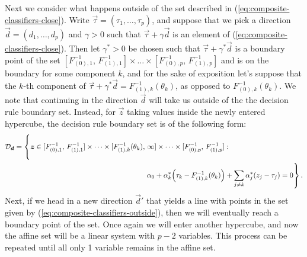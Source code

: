 Next we consider what happens outside of the set described in
(\ref{eq:composite-classifiers-close}).  Write
$\vec{\tau} = (\tau_1, \dots, \tau_p)$, and suppose that we pick a direction
$\vec{d} = (d_1, \dots, d_p)$ and $\gamma > 0$ such that
$\vec{\tau} + \gamma \vec{d}$ is an element of
(\ref{eq:composite-classifiers-close}).  Then let $\gamma^{*} > 0$ be chosen
such that $\vec{\tau} + \gamma^{*} \vec{d}$ is a boundary point of the set
$[F_{(0),1}^{-1},\, F_{(1),1}^{-1}] \times \dots \times [F_{(0),p}^{-1},\,
F_{(1),p}^{-1}]$ and is on the boundary for some component $k$, and for the sake
of exposition let's suppose that the $k$-th component of
$\vec{\tau} + \gamma^{*} \vec{d} = F_{(1),k}^{-1}(\theta_k)$, as opposed to
$F_{(0),k}^{-1}(\theta_k)$.  We note that continuing in the direction $\vec{d}$
will take us outside of the the decision rule boundary set.  Instead, for
$\vec{z}$ taking values inside the newly entered hypercube, the decision rule
boundary set is of the following form:
\begin{equation}
  \label{eq:composite-classifiers-outside}
  \begin{split}
    \mathcal{D}_{\vec{d}} = \left\{
      \vec{z} \in [F_{(0),1}^{-1},\, F_{(1),1}^{-1}]
      \times \dots \times
      [F_{(1),k}^{-1}(\theta_k),\, \infty]
      \times \dots \times
      [F_{(0),p}^{-1},\, F_{(1),p}^{-1}] :
      \phantom{\hspace{30mm} \sum_{j=1}^p}
    \right.  \\
    \left.
      \hfill
      \alpha_0 +
      \alpha_k^{*} \Big(\tau_k - F_{(1),k}^{-1}(\theta_k)\Big) +
      \sum_{j\ne k} \alpha_j^{*} (z_j - \tau_j) = 0
    \right\} .
  \end{split}
\end{equation}
Next, if we head in a new direction $\vec{d}'$ that yields a line with points in
the set given by (\ref{eq:composite-classifiers-outside}), then we will
eventually reach a boundary point of the set.  Once again we will enter another
hypercube, and now the affine set will be a linear system with $p - 2$
variables.  This process can be repeated until all only 1 variable remains in
the affine set.

